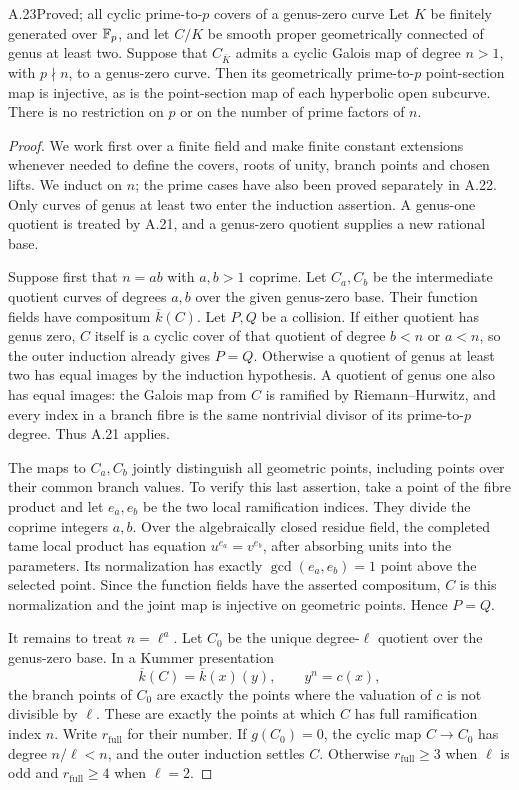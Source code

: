 \begin{claim}{A.23}{Proved; all cyclic prime-to-$p$ covers of a genus-zero curve}
Let $K$ be finitely generated over $\mathbb F_p$, and let $C/K$
be smooth proper geometrically connected of genus at least
two. Suppose that $C_{\overline K}$ admits a cyclic Galois
map of degree $n>1$, with $p\nmid n$, to a genus-zero
curve. Then its geometrically prime-to-$p$ point-section
map is injective, as is the point-section map of each
hyperbolic open subcurve. There is no restriction on $p$
or on the number of prime factors of $n$.
\end{claim}
\begin{proof}
We work first over a finite field and make finite constant
extensions whenever needed to define the covers, roots of
unity, branch points and chosen lifts. We induct on $n$;
the prime cases have also been proved separately in A.22.
Only curves of genus at least two enter the induction
assertion. A genus-one quotient is treated by A.21, and a
genus-zero quotient supplies a new rational base.

Suppose first that $n=ab$ with $a,b>1$ coprime. Let
$C_a,C_b$ be the intermediate quotient curves of degrees
$a,b$ over the given genus-zero base. Their function fields
have compositum $\overline k(C)$. Let $P,Q$ be a collision.
If either quotient has genus zero, $C$ itself is a cyclic
cover of that quotient of degree $b<n$ or $a<n$, so the
outer induction already gives $P=Q$. Otherwise a quotient
of genus at least two has equal images by the induction
hypothesis. A quotient of genus one also has equal images:
the Galois map from $C$ is ramified by Riemann--Hurwitz,
and every index in a branch fibre is the same nontrivial
divisor of its prime-to-$p$ degree. Thus A.21 applies.

The maps to $C_a,C_b$ jointly distinguish all geometric
points, including points over their common branch values.
To verify this last assertion, take a point of the fibre
product and let $e_a,e_b$ be the two local ramification
indices. They divide the coprime integers $a,b$. Over the
algebraically closed residue field, the completed tame
local product has equation $u^{e_a}=v^{e_b}$, after
absorbing units into the parameters. Its normalization
has exactly $\gcd(e_a,e_b)=1$ point above the selected
point. Since the function fields have the asserted
compositum, $C$ is this normalization and the joint map is
injective on geometric points. Hence $P=Q$.

It remains to treat $n=\ell^a$. Let $C_0$ be the unique
degree-$\ell$ quotient over the genus-zero base. In a
Kummer presentation
\[
 \overline k(C)=\overline k(x)(y),\qquad y^n=c(x),
\]
the branch points of $C_0$ are exactly the points where
the valuation of $c$ is not divisible by $\ell$. These
are exactly the points at which $C$ has full ramification
index $n$. Write $r_{\mathrm{full}}$ for their number. If
$g(C_0)=0$, the cyclic map $C\to C_0$ has degree
$n/\ell<n$, and the outer induction settles $C$.
Otherwise $r_{\mathrm{full}}\ge3$ when $\ell$ is odd and
$r_{\mathrm{full}}\ge4$ when $\ell=2$.


\end{proof}
